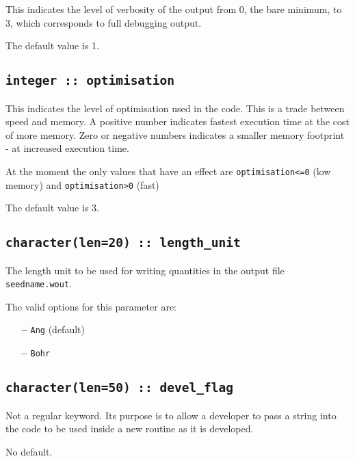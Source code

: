 This indicates the level of verbosity of the output from 0,
the bare minimum, to 3, which corresponds to full debugging output.

The default value is 1.

\subsection[optimisation]{\tt integer :: optimisation}

This indicates the level of optimisation used in the code. This is a
trade between speed and memory. A positive number indicates fastest execution time at the cost
of more memory. Zero or negative numbers indicates a smaller memory footprint - at increased
execution time.

At the moment the only values that have an effect are \verb#optimisation<=0# (low memory) and \verb#optimisation>0# (fast)

The default value is 3.



\subsection[length\_unit]{\tt character(len=20) :: length\_unit}
The length unit to be used for writing quantities in the output file
{\tt seedname.wout}.

The valid options for this parameter are:
\begin{itemize}
\item[{\bf --}]  \verb#Ang# (default)
\item[{\bf --}]  \verb#Bohr#
\end{itemize}

\subsection[devel\_flag]{\tt character(len=50) :: devel\_flag}

Not a regular keyword. Its purpose is to allow a developer to pass a
string into the code to be used inside a new routine as it is developed.

No default.

%
%


